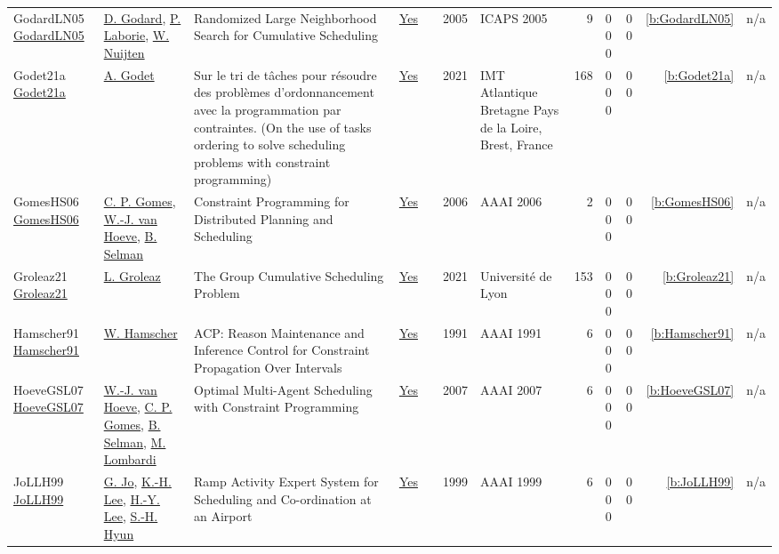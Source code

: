 {\begin{longtable}{>{\raggedright\arraybackslash}p{3cm}>{\raggedright\arraybackslash}p{4.5cm}>{\raggedright\arraybackslash}p{6.0cm}rrrp{2.5cm}rp{1cm}p{1cm}rr}
GodardLN05 \href{http://www.aaai.org/Library/ICAPS/2005/icaps05-009.php}{GodardLN05} & \hyperref[auth:a774]{D. Godard}, \hyperref[auth:a118]{P. Laborie}, \hyperref[auth:a656]{W. Nuijten} & Randomized Large Neighborhood Search for Cumulative Scheduling & \href{../works/GodardLN05.pdf}{Yes} & \cite{GodardLN05} & 2005 & ICAPS 2005 & 9 & 0 0 0 & 0 0 & \ref{b:GodardLN05} & n/a\\
Godet21a \href{https://tel.archives-ouvertes.fr/tel-03681868}{Godet21a} & \hyperref[auth:a471]{A. Godet} & Sur le tri de t{\^{a}}ches pour r{\'{e}}soudre des probl{\`{e}}mes d'ordonnancement avec la programmation par contraintes. (On the use of tasks ordering to solve scheduling problems with constraint programming) & \href{../works/Godet21a.pdf}{Yes} & \cite{Godet21a} & 2021 & {IMT} Atlantique Bretagne Pays de la Loire, Brest, France & 168 & 0 0 0 & 0 0 & \ref{b:Godet21a} & n/a\\
GomesHS06 \href{http://www.aaai.org/Library/Symposia/Spring/2006/ss06-04-024.php}{GomesHS06} & \hyperref[auth:a642]{C. P. Gomes}, \hyperref[auth:a206]{W.-J. van Hoeve}, \hyperref[auth:a643]{B. Selman} & Constraint Programming for Distributed Planning and Scheduling & \href{../works/GomesHS06.pdf}{Yes} & \cite{GomesHS06} & 2006 & AAAI 2006 & 2 & 0 0 0 & 0 0 & \ref{b:GomesHS06} & n/a\\
Groleaz21 \href{https://hal.science/tel-03266690}{Groleaz21} & \hyperref[auth:a83]{L. Groleaz} & {The Group Cumulative Scheduling Problem} & \href{../works/Groleaz21.pdf}{Yes} & \cite{Groleaz21} & 2021 & {Universit{\'e} de Lyon} & 153 & 0 0 0 & 0 0 & \ref{b:Groleaz21} & n/a\\
Hamscher91 \href{http://www.aaai.org/Library/AAAI/1991/aaai91-079.php}{Hamscher91} & \hyperref[auth:a1276]{W. Hamscher} & {ACP:} Reason Maintenance and Inference Control for Constraint Propagation Over Intervals & \href{../works/Hamscher91.pdf}{Yes} & \cite{Hamscher91} & 1991 & AAAI 1991 & 6 & 0 0 0 & 0 0 & \ref{b:Hamscher91} & n/a\\
HoeveGSL07 \href{http://www.aaai.org/Library/AAAI/2007/aaai07-291.php}{HoeveGSL07} & \hyperref[auth:a206]{W.-J. van Hoeve}, \hyperref[auth:a642]{C. P. Gomes}, \hyperref[auth:a643]{B. Selman}, \hyperref[auth:a142]{M. Lombardi} & Optimal Multi-Agent Scheduling with Constraint Programming & \href{../works/HoeveGSL07.pdf}{Yes} & \cite{HoeveGSL07} & 2007 & AAAI 2007 & 6 & 0 0 0 & 0 0 & \ref{b:HoeveGSL07} & n/a\\
JoLLH99 \href{http://www.aaai.org/Library/IAAI/1999/iaai99-114.php}{JoLLH99} & \hyperref[auth:a1319]{G. Jo}, \hyperref[auth:a1320]{K.-H. Lee}, \hyperref[auth:a1321]{H.-Y. Lee}, \hyperref[auth:a1322]{S.-H. Hyun} & Ramp Activity Expert System for Scheduling and Co-ordination at an Airport & \href{../works/JoLLH99.pdf}{Yes} & \cite{JoLLH99} & 1999 & AAAI 1999 & 6 & 0 0 0 & 0 0 & \ref{b:JoLLH99} & n/a\\

\end{longtable}}
